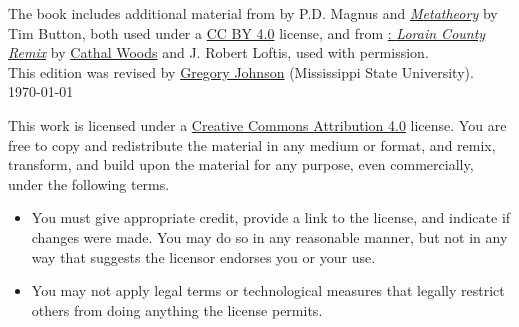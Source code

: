 \noindent The book includes additional material from \forallx{} by P.D. Magnus 
and \href{http://people.ds.cam.ac.uk/tecb2/metatheory.shtml}{\emph{Metatheory}} by Tim Button, 
both used under a \href{https://creativecommons.org/licenses/by/4.0/}{CC BY 4.0} license, 
and from \href{https://github.com/rob-helpy-chalk/openintroduction}{\forallx: \emph{Lorain County Remix}} by \href{https://sites.google.com/site/cathalwoods/}{Cathal Woods} and J. Robert Loftis, used with permission.\\[1ex]

\noindent This edition was revised by \href{http://loighic.net/}{Gregory Johnson} (Mississippi State University).\\[1ex]
\indent \today

\bigskip
\bigskip

\noindent \footnotesize This work is licensed under a \href{https://creativecommons.org/licenses/by/4.0/}{Creative Commons Attribution 4.0} license. 
You are free to copy and redistribute the material in any medium or format, and  remix, transform, and build upon the material for any purpose, even commercially, under the following terms.
\begin{itemize}
\item[] You must give appropriate credit, provide a link to the license, and indicate if changes were made. You may do so in any reasonable manner, but not in any way that suggests the licensor endorses you or your use.
\item[] You may not apply legal terms or technological measures that legally restrict others from doing anything the license permits.
\end{itemize}



\normalsize 
